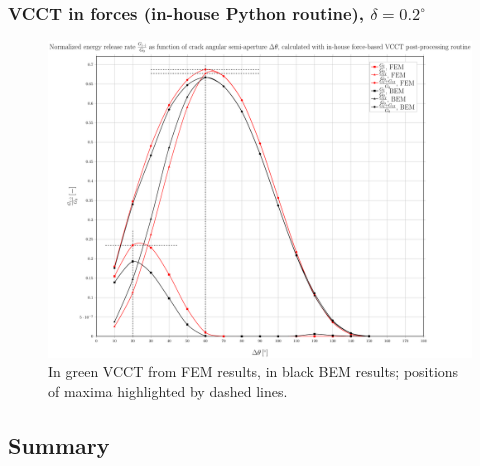 \documentclass[first,firstsupp,lastsupp,handout,last,hyperref,table]{ETHclass}
\begin{document}
\begin{frame}
\frametitle{\small VCCT in forces (in-house Python routine), $\delta=0.2^{\circ}$}
\vspace{-0.5cm}
\centering
\captionsetup[figure]{font=scriptsize,labelfont=scriptsize}
\begin{figure}[!h]
\centering
\includegraphics[height=0.7\textheight]{2017-07-10_AbqRunSummary_SmallStrainD02_M-F-VCCT_Summary.pdf}
  \caption{\scriptsize In green VCCT from FEM results, in black BEM results; positions of maxima highlighted by dashed lines.}
  \label{fig:res1}
\end{figure}
\end{frame}



\subsection{Summary}
\end{document}
